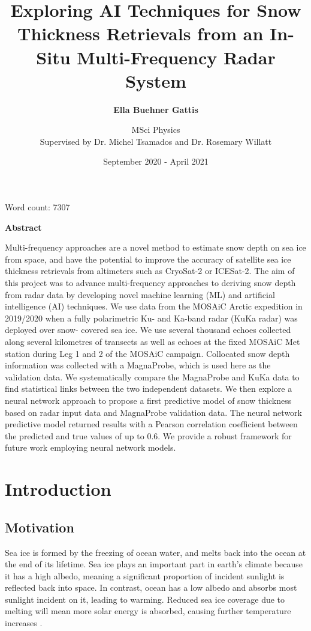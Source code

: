 \documentclass[11pt, a4paper]{article}
\title{\bfseries{{\huge{Exploring AI Techniques for Snow Thickness Retrievals from an In-Situ Multi-Frequency Radar System}}}}
\subtitle{\bfseries\LARGE{Ella Buehner Gattis}}
\author{\Large MSci Physics\\[1cm]{\Large Supervised by Dr. Michel Tsamados and Dr. Rosemary Willatt}\\[1cm]}
\date{September 2020 - April 2021\\[2cm]}
\begin{document}
\onehalfspacing

\maketitle
Word count: 7307



\pagebreak
\begin{center}
\begin{large}
 \bfseries{Abstract}
\end{large} 
\end{center}


Multi-frequency approaches are a novel method to estimate snow depth on sea ice from space, and have the potential to improve the accuracy of satellite sea ice thickness retrievals from altimeters such as CryoSat-2 or ICESat-2. The aim of this project was to advance multi-frequency approaches to deriving snow depth from radar data by developing novel machine learning (ML) and artificial intelligence (AI) techniques. We use data from the MOSAiC Arctic expedition in 2019/2020 when a fully polarimetric Ku- and Ka-band radar (KuKa radar) was deployed over snow- covered sea ice. We use several thousand echoes collected along several kilometres of transects as well as echoes at the fixed MOSAiC Met station during Leg 1 and 2 of the MOSAiC campaign. Collocated snow depth information was collected with a MagnaProbe, which is used here as the validation data. We systematically compare the MagnaProbe and KuKa data to find statistical links between the two independent datasets. We then explore a neural network approach to propose a first predictive model of snow thickness based on radar input data and MagnaProbe validation data. The neural network predictive model returned results with a Pearson correlation coefficient between the predicted and true values of up to 0.6. We provide a robust framework for future work employing neural network models.

\pagebreak
\tableofcontents
\pagebreak

\section{Introduction}

\subsection{Motivation}
Sea ice is formed by the freezing of ocean water,  and melts back into the ocean at the end of its lifetime.  Sea ice plays an important part in earth's climate because it has a high albedo,  meaning a significant proportion of incident sunlight is reflected back into space.  In contrast, ocean has a low albedo and absorbs most sunlight incident on it,  leading to warming.  Reduced sea ice coverage due to melting will mean more solar energy is absorbed, causing further temperature increases \cite{albedo}.
\end{document}
